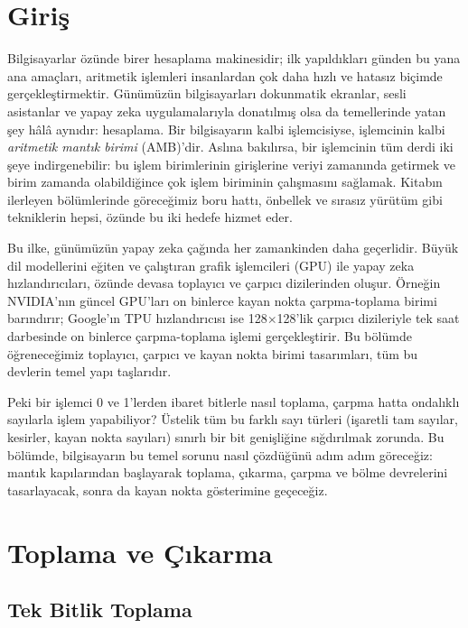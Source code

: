 \section*{Giriş}

Bilgisayarlar özünde birer hesaplama makinesidir; ilk yapıldıkları günden bu yana ana amaçları, aritmetik işlemleri insanlardan çok daha hızlı ve hatasız biçimde gerçekleştirmektir. Günümüzün bilgisayarları dokunmatik ekranlar, sesli asistanlar ve yapay zeka uygulamalarıyla donatılmış olsa da temellerinde yatan şey hâlâ aynıdır: hesaplama. Bir bilgisayarın kalbi işlemcisiyse, işlemcinin kalbi \emph{aritmetik mantık birimi} (AMB)'dir. Aslına bakılırsa, bir işlemcinin tüm derdi iki şeye indirgenebilir: bu işlem birimlerinin girişlerine veriyi zamanında getirmek ve birim zamanda olabildiğince çok işlem biriminin çalışmasını sağlamak. Kitabın ilerleyen bölümlerinde göreceğimiz boru hattı, önbellek ve sırasız yürütüm gibi tekniklerin hepsi, özünde bu iki hedefe hizmet eder.

Bu ilke, günümüzün yapay zeka çağında her zamankinden daha geçerlidir. Büyük dil modellerini eğiten ve çalıştıran grafik işlemcileri (GPU) ile yapay zeka hızlandırıcıları, özünde devasa toplayıcı ve çarpıcı dizilerinden oluşur. Örneğin NVIDIA'nın güncel GPU'ları on binlerce kayan nokta çarpma-toplama birimi barındırır; Google'ın TPU hızlandırıcısı ise 128$\times$128'lik çarpıcı dizileriyle tek saat darbesinde on binlerce çarpma-toplama işlemi gerçekleştirir. Bu bölümde öğreneceğimiz toplayıcı, çarpıcı ve kayan nokta birimi tasarımları, tüm bu devlerin temel yapı taşlarıdır.

Peki bir işlemci 0 ve 1'lerden ibaret bitlerle nasıl toplama, çarpma hatta ondalıklı sayılarla işlem yapabiliyor? Üstelik tüm bu farklı sayı türleri (işaretli tam sayılar, kesirler, kayan nokta sayıları) sınırlı bir bit genişliğine sığdırılmak zorunda. Bu bölümde, bilgisayarın bu temel sorunu nasıl çözdüğünü adım adım göreceğiz: mantık kapılarından başlayarak toplama, çıkarma, çarpma ve bölme devrelerini tasarlayacak, sonra da kayan nokta gösterimine geçeceğiz.


\section{Toplama ve Çıkarma}
\label{sec:toplama-cikarma}

\subsection{Tek Bitlik Toplama}

